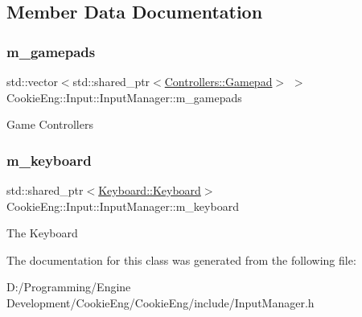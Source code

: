 \subsection{Member Data Documentation}
\mbox{\label{class_cookie_eng_1_1_input_1_1_input_manager_ae0b4f61fc7337f58498b9d6eda637384}} 
\subsubsection{\texorpdfstring{m\+\_\+gamepads}{m\_gamepads}}
{\footnotesize\ttfamily std\+::vector$<$std\+::shared\+\_\+ptr$<$\hyperlink{class_cookie_eng_1_1_input_1_1_controllers_1_1_gamepad}{Controllers\+::\+Gamepad}$>$ $>$ Cookie\+Eng\+::\+Input\+::\+Input\+Manager\+::m\+\_\+gamepads\hspace{0.3cm}{\ttfamily [protected]}}

Game Controllers \mbox{\label{class_cookie_eng_1_1_input_1_1_input_manager_aa8137e98a8515c6da82cd3ca4f2f04bf}} 
\subsubsection{\texorpdfstring{m\+\_\+keyboard}{m\_keyboard}}
{\footnotesize\ttfamily std\+::shared\+\_\+ptr$<$\hyperlink{class_cookie_eng_1_1_input_1_1_keyboard_1_1_keyboard}{Keyboard\+::\+Keyboard}$>$ Cookie\+Eng\+::\+Input\+::\+Input\+Manager\+::m\+\_\+keyboard\hspace{0.3cm}{\ttfamily [protected]}}

The Keyboard 

The documentation for this class was generated from the following file\+:\begin{DoxyCompactItemize}
\item 
D\+:/\+Programming/\+Engine Development/\+Cookie\+Eng/\+Cookie\+Eng/include/Input\+Manager.\+h\end{DoxyCompactItemize}
